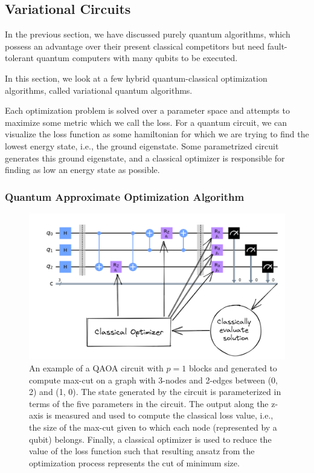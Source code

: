 \subsection{Variational Circuits}
\label{sec:variational-circuits}

In the previous section, we have discussed purely quantum algorithms, which possess an advantage over their present classical competitors but need fault-tolerant quantum computers with many qubits to be executed.

In this section, we look at a few hybrid quantum-classical optimization algorithms, called variational quantum algorithms. 

Each optimization problem is solved over a parameter space and attempts to maximize some metric which we call the loss. For a quantum circuit, we can visualize the loss function as some hamiltonian for which we are trying to find the lowest energy state, i.e., the ground eigenstate. Some parametrized circuit generates this ground eigenstate, and a classical optimizer is responsible for finding as low an energy state as possible.

\subsubsection{Quantum Approximate Optimization Algorithm}
\label{sec:variational-circuits-qaoa}

\begin{figure}[ht]
    \centering
    \includegraphics[width=0.7\linewidth]{figures/intro/qaoa-optimization.png}
    \caption[Variational Circuit for QAOA]{An example of a QAOA circuit with $p = 1$ blocks and generated to compute max-cut on a graph with 3-nodes and 2-edges between (0, 2) and (1, 0). The state generated by the circuit is parameterized in terms of the five parameters in the circuit. The output along the z-axis is measured and used to compute the classical loss value, i.e., the size of the max-cut given to which each node (represented by a qubit) belongs. Finally, a classical optimizer is used to reduce the value of the loss function such that resulting ansatz from the optimization process represents the cut of minimum size.}
\end{figure}

